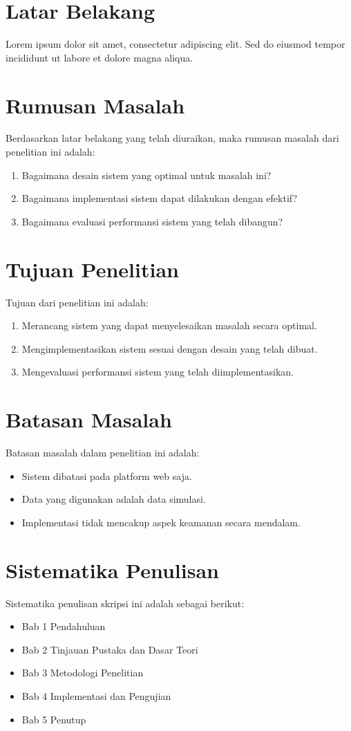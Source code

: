 \documentclass[12pt,a4paper,oneside]{book}
\begin{document}
\section{Latar Belakang}
Lorem ipsum dolor sit amet, consectetur adipiscing elit. Sed do eiusmod tempor incididunt ut labore et dolore magna aliqua. 

\section{Rumusan Masalah}
Berdasarkan latar belakang yang telah diuraikan, maka rumusan masalah dari penelitian ini adalah:
\begin{enumerate}
    \item Bagaimana desain sistem yang optimal untuk masalah ini?
    \item Bagaimana implementasi sistem dapat dilakukan dengan efektif?
    \item Bagaimana evaluasi performansi sistem yang telah dibangun?
\end{enumerate}

\section{Tujuan Penelitian}
Tujuan dari penelitian ini adalah:
\begin{enumerate}
    \item Merancang sistem yang dapat menyelesaikan masalah secara optimal.
    \item Mengimplementasikan sistem sesuai dengan desain yang telah dibuat.
    \item Mengevaluasi performansi sistem yang telah diimplementasikan.
\end{enumerate}

\section{Batasan Masalah}
Batasan masalah dalam penelitian ini adalah:
\begin{itemize}
    \item Sistem dibatasi pada platform web saja.
    \item Data yang digunakan adalah data simulasi.
    \item Implementasi tidak mencakup aspek keamanan secara mendalam.
\end{itemize}

\section{Sistematika Penulisan}
Sistematika penulisan skripsi ini adalah sebagai berikut:
\begin{itemize}
    \item Bab 1 Pendahuluan
    \item Bab 2 Tinjauan Pustaka dan Dasar Teori
    \item Bab 3 Metodologi Penelitian
    \item Bab 4 Implementasi dan Pengujian
    \item Bab 5 Penutup
\end{itemize}
\end{document}
